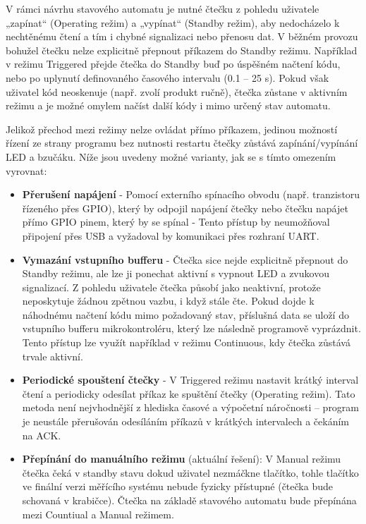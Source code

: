 V rámci návrhu stavového automatu je nutné čtečku z pohledu uživatele „zapínat“ (Operating režim) a „vypínat“ (Standby režim), aby nedocházelo k nechtěnému čtení a tím i chybné signalizaci nebo přenosu dat. V běžném provozu bohužel čtečku nelze explicitně přepnout příkazem do Standby režimu. Například v režimu Triggered přejde čtečka do Standby buď po úspěšném načtení kódu, nebo po uplynutí definovaného časového intervalu (0.1 – 25 s). Pokud však uživatel kód neoskenuje (např. zvolí produkt ručně), čtečka zůstane v aktivním režimu a je možné omylem načíst další kódy i mimo určený stav automatu.

Jelikož přechod mezi režimy nelze ovládat přímo příkazem, jedinou možností řízení ze strany programu bez nutnosti restartu čtečky zůstává zapínání/vypínání LED a bzučáku. Níže jsou uvedeny možné varianty, jak se s tímto omezením vyrovnat:

\begin{itemize}
    \item \textbf{Přerušení napájení} - Pomocí externího spínacího obvodu (např. tranzistoru řízeného přes GPIO), který by odpojil napájení čtečky nebo čtečku napájet přímo GPIO pinem, který by se spínal - Tento přístup by neumožňoval připojení přes USB a vyžadoval by komunikaci přes rozhraní UART.
    \item \textbf{Vymazání vstupního bufferu} - Čtečka sice nejde explicitně přepnout do Standby režimu, ale lze ji ponechat aktivní s vypnout LED a zvukovou signalizací. Z pohledu uživatele čtečka působí jako neaktivní, protože neposkytuje žádnou zpětnou vazbu, i když stále čte. Pokud dojde k náhodnému načtení kódu mimo požadovaný stav, příslušná data se uloží do vstupního bufferu mikrokontroléru, který lze následně programově vyprázdnit. Tento přístup lze využít například v režimu Continuous, kdy čtečka zůstává trvale aktivní.
    \item \textbf{Periodické spouštení čtečky} - V Triggered režimu nastavit krátký interval čtení a periodicky odesílat příkaz ke spuštění čtečky (Operating režim). Tato metoda není nejvhodnější z hlediska časové a výpočetní náročnosti – program je neustále přerušován odesíláním příkazů v krátkých intervalech a čekáním na ACK.
    \item \textbf{Přepínání do manuálního režimu} (aktuální řešení): V Manual režimu čtečka čeká v standby stavu dokud uživatel nezmáčkne tlačítko, tohle tlačítko ve finální verzi měřícího systému nebude fyzicky přístupné (čtečka bude schovaná v krabičce). Čtečka na základě stavového automatu bude přepínána mezi Countiual a Manual režimem.
\end{itemize}




